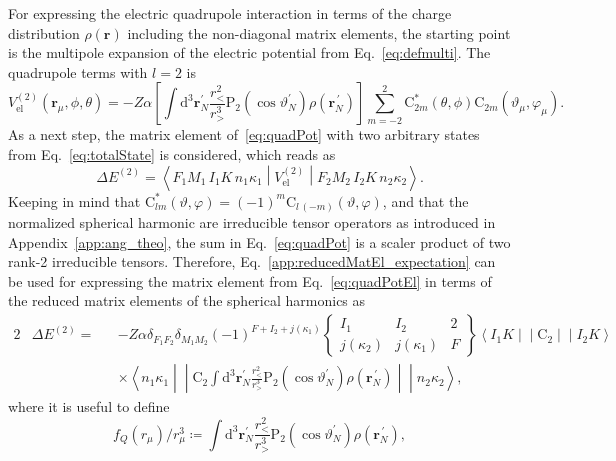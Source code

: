 For expressing the electric quadrupole interaction in terms of the charge distribution $\rho(\mathbf{r})$ including the non-diagonal matrix elements, the starting point is the multipole expansion of the electric potential from Eq.~\eqref{eq:defmulti}. The quadrupole terms with $l=2$ is
\begin{equation}
V^{(2)}_{\text{el}}(\mathbf{r}_\mu,\phi,\theta)=-Z\alpha \left[ \int \text{d}^3\mathbf{r}^{\prime}_N \frac{r_<^2}{r_>^{3}}\text{P}_{2}(\cos \vartheta_N^{\prime})\rho(\mathbf{r}_N^{\,\prime})\right]\sum_{m=-2}^2 \text{C}^*_{2m}(\theta,\phi)\text{C}_{2m}(\vartheta_\mu,\varphi_\mu).
\label{eq:quadPot}
\end{equation}
As a next step, the matrix element of~\eqref{eq:quadPot} with two arbitrary states from Eq.~\eqref{eq:totalState} is considered, which reads as
\begin{equation}
\Delta E^{(2)}=\left<F_1M_1\,I_1K \,n_1\kappa_1 \middle| V^{(2)}_{\text{el}} \middle|F_2M_2\,I_2K \,n_2\kappa_2 \right>.
\label{eq:quadPotEl}
\end{equation}
Keeping in mind that $\text{C}_{lm}^*(\vartheta,\varphi) =(-1)^m\text{C}_{l\,(-m)}(\vartheta,\varphi)$, and that the normalized spherical harmonic are irreducible tensor operators as introduced in Appendix~\ref{app:ang_theo}, the sum in Eq.~\eqref{eq:quadPot} is a scaler product of two rank-2 irreducible tensors. Therefore, Eq.~\eqref{app:reducedMatEl_expectation} can be used for expressing the matrix element from Eq.~\eqref{eq:quadPotEl} in terms of the reduced matrix elements of the spherical harmonics as
\begin{alignat}{2}
&\Delta E^{(2)} =&& -Z\alpha\delta_{F_1F_2}\delta_{M_1M_2} (-1)^{F+I_2+j(\kappa_1)}
\begin{Bmatrix}
I_1 & I_2 & 2 \\
j(\kappa_2) & j(\kappa_1)&F
\label{eq:quadNonDiagEl}
\end{Bmatrix}
\left<I_1K\middle|\middle|\text{C}_2 \middle|\middle| I_2 K \right>\\[7.5pt]
&&&\times\left<n_1\kappa_1\middle|\middle|\text{C}_2  \int \text{d}^3\mathbf{r}^{\prime}_N \frac{r_<^2}{r_>^{3}}\text{P}_{2}(\cos \vartheta_N^{\prime})\rho(\mathbf{r}_N^{\,\prime}) \middle|\middle| n_2\kappa_2 \right>,
\end{alignat}
where it is useful to define
\begin{equation}
\label{eq:quadDistr}
f_Q(r_\mu)/r_\mu^3 \coloneqq \int \text{d}^3\mathbf{r}^{\prime}_N \frac{r_<^2}{r_>^{3}}\text{P}_{2}(\cos \vartheta_N^{\prime})\rho(\mathbf{r}_N^{\,\prime}),
\end{equation}
